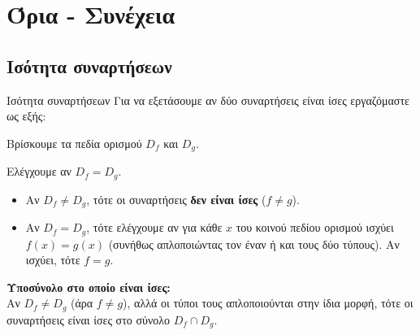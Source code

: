 \section{Όρια - Συνέχεια}

\subsection{Ισότητα συναρτήσεων}
\begin{askhsh}{Ισότητα συναρτήσεων}
Για να εξετάσουμε αν δύο συναρτήσεις είναι ίσες εργαζόμαστε ως εξής:

\bhmata
\begin{bhma}
\item Βρίσκουμε τα πεδία ορισμού $D_f$ και $D_g$.
\item Ελέγχουμε αν $D_f = D_g$. 
\begin{itemize}
    \item Αν $D_f \neq D_g$, τότε οι συναρτήσεις \textbf{δεν είναι ίσες} ($f \neq g$).
    \item Αν $D_f = D_g$, τότε ελέγχουμε αν για κάθε $x$ του κοινού πεδίου ορισμού ισχύει $f(x) = g(x)$ (συνήθως απλοποιώντας τον έναν ή και τους δύο τύπους). Αν ισχύει, τότε \textbf{$f=g$}.
\end{itemize}
\end{bhma}
\textbf{Υποσύνολο στο οποίο είναι ίσες:} \\
Αν $D_f \neq D_g$ (άρα $f \neq g$), αλλά οι τύποι τους απλοποιούνται στην ίδια μορφή, τότε οι συναρτήσεις είναι ίσες στο σύνολο $D_f \cap D_g$.
\end{askhsh}


